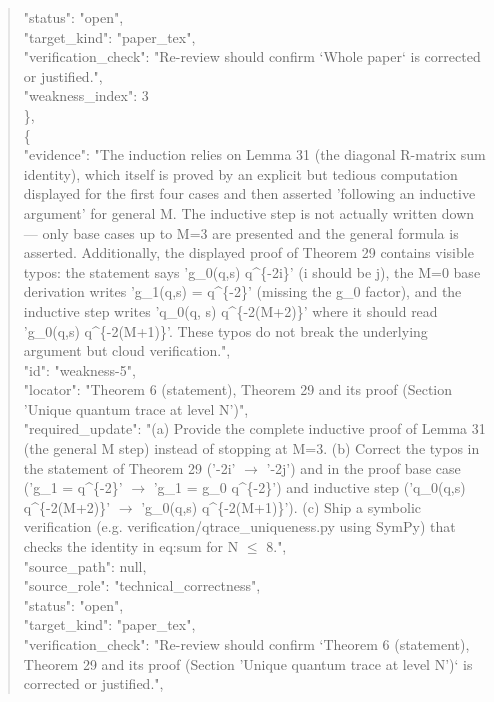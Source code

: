 \documentclass[11pt]{article}
\begin{document}
\begin{quote}
      "status": "open",\\
      "target\_kind": "paper\_tex",\\
      "verification\_check": "Re-review should confirm `Whole paper` is corrected or justified.",\\
      "weakness\_index": 3\\
    \},\\
    \{\\
      "evidence": "The induction relies on Lemma 31 (the diagonal R-matrix sum identity), which itself is proved by an explicit but tedious computation displayed for the first four cases and then asserted 'following an inductive argument' for general M. The inductive step is not actually written down --- only base cases up to M=3 are presented and the general formula is asserted. Additionally, the displayed proof of Theorem 29 contains visible typos: the statement says 'g\_0(q,s) q\^{}\{-2i\}' (i should be j), the M=0 base derivation writes 'g\_1(q,s) = q\^{}\{-2\}' (missing the g\_0 factor), and the inductive step writes 'q\_0(q, s) q\^{}\{-2(M+2)\}' where it should read 'g\_0(q,s) q\^{}\{-2(M+1)\}'. These typos do not break the underlying argument but cloud verification.",\\
      "id": "weakness-5",\\
      "locator": "Theorem 6 (statement), Theorem 29 and its proof (Section 'Unique quantum trace at level N')",\\
      "required\_update": "(a) Provide the complete inductive proof of Lemma 31 (the general M step) instead of stopping at M=3. (b) Correct the typos in the statement of Theorem 29 ('-2i' \ensuremath{\to} '-2j') and in the proof base case ('g\_1 = q\^{}\{-2\}' \ensuremath{\to} 'g\_1 = g\_0 q\^{}\{-2\}') and inductive step ('q\_0(q,s) q\^{}\{-2(M+2)\}' \ensuremath{\to} 'g\_0(q,s) q\^{}\{-2(M+1)\}'). (c) Ship a symbolic verification (e.g. verification/qtrace\_uniqueness.py using SymPy) that checks the identity in eq:sum for N \ensuremath{\le} 8.",\\
      "source\_path": null,\\
      "source\_role": "technical\_correctness",\\
      "status": "open",\\
      "target\_kind": "paper\_tex",\\
      "verification\_check": "Re-review should confirm `Theorem 6 (statement), Theorem 29 and its proof (Section 'Unique quantum trace at level N')` is corrected or justified.",\\

\end{quote}
\end{document}
